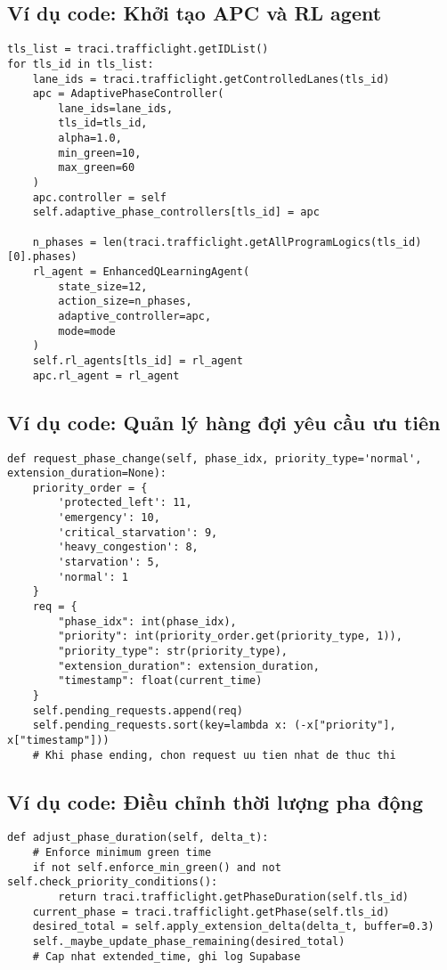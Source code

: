 \subsection{Ví dụ code: Khởi tạo APC và RL agent}
\begin{lstlisting}[style=py,caption={Khởi tạo bộ điều khiển và agent RL}]
tls_list = traci.trafficlight.getIDList()
for tls_id in tls_list:
    lane_ids = traci.trafficlight.getControlledLanes(tls_id)
    apc = AdaptivePhaseController(
        lane_ids=lane_ids,
        tls_id=tls_id,
        alpha=1.0,
        min_green=10,
        max_green=60
    )
    apc.controller = self
    self.adaptive_phase_controllers[tls_id] = apc

    n_phases = len(traci.trafficlight.getAllProgramLogics(tls_id)[0].phases)
    rl_agent = EnhancedQLearningAgent(
        state_size=12,
        action_size=n_phases,
        adaptive_controller=apc,
        mode=mode
    )
    self.rl_agents[tls_id] = rl_agent
    apc.rl_agent = rl_agent
\end{lstlisting}

\subsection{Ví dụ code: Quản lý hàng đợi yêu cầu ưu tiên}
\begin{lstlisting}[style=py,caption={Xếp và xử lý yêu cầu chuyển pha có ưu tiên}]
def request_phase_change(self, phase_idx, priority_type='normal', extension_duration=None):
    priority_order = {
        'protected_left': 11,
        'emergency': 10,
        'critical_starvation': 9,
        'heavy_congestion': 8,
        'starvation': 5,
        'normal': 1
    }
    req = {
        "phase_idx": int(phase_idx),
        "priority": int(priority_order.get(priority_type, 1)),
        "priority_type": str(priority_type),
        "extension_duration": extension_duration,
        "timestamp": float(current_time)
    }
    self.pending_requests.append(req)
    self.pending_requests.sort(key=lambda x: (-x["priority"], x["timestamp"]))
    # Khi phase ending, chon request uu tien nhat de thuc thi
\end{lstlisting}

\subsection{Ví dụ code: Điều chỉnh thời lượng pha động}
\begin{lstlisting}[style=py,caption={Điều chỉnh thời lượng pha theo reward}]
def adjust_phase_duration(self, delta_t):
    # Enforce minimum green time
    if not self.enforce_min_green() and not self.check_priority_conditions():
        return traci.trafficlight.getPhaseDuration(self.tls_id)
    current_phase = traci.trafficlight.getPhase(self.tls_id)
    desired_total = self.apply_extension_delta(delta_t, buffer=0.3)
    self._maybe_update_phase_remaining(desired_total)
    # Cap nhat extended_time, ghi log Supabase
\end{lstlisting}

